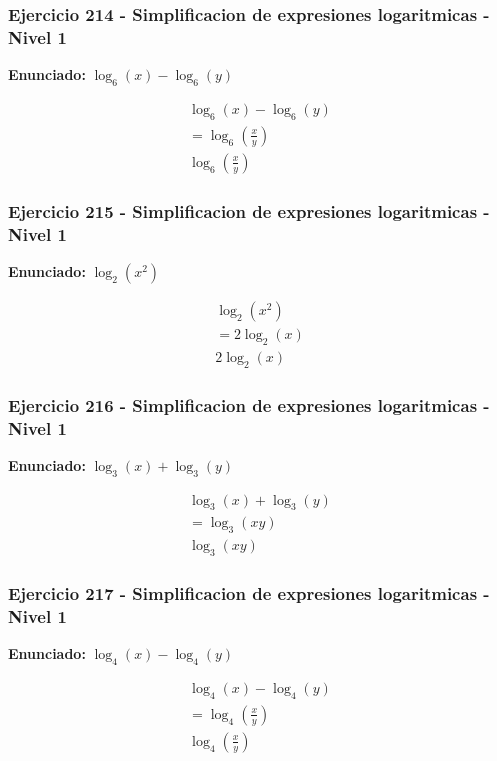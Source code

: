 \documentclass[12pt,a4paper]{article}
\begin{document}
\subsubsection*{Ejercicio 214 - Simplificacion de expresiones logaritmicas - Nivel 1}
\textbf{Enunciado:} \(\log_{6}\left(x\right)-\log_{6}\left(y\right)\)

\[
\begin{aligned}
\log_{6}\left(x\right)-\log_{6}\left(y\right)\\
=\log_{6}\left(\frac{x}{y}\right)\\
\boxed{\log_{6}\left(\frac{x}{y}\right)}
\end{aligned}
\]


\subsubsection*{Ejercicio 215 - Simplificacion de expresiones logaritmicas - Nivel 1}
\textbf{Enunciado:} \(\log_{2}\left(x^{2}\right)\)

\[
\begin{aligned}
\log_{2}\left(x^{2}\right)\\
=2\log_{2}\left(x\right)\\
\boxed{2\log_{2}\left(x\right)}
\end{aligned}
\]


\subsubsection*{Ejercicio 216 - Simplificacion de expresiones logaritmicas - Nivel 1}
\textbf{Enunciado:} \(\log_{3}\left(x\right)+\log_{3}\left(y\right)\)

\[
\begin{aligned}
\log_{3}\left(x\right)+\log_{3}\left(y\right)\\
=\log_{3}\left(xy\right)\\
\boxed{\log_{3}\left(xy\right)}
\end{aligned}
\]


\subsubsection*{Ejercicio 217 - Simplificacion de expresiones logaritmicas - Nivel 1}
\textbf{Enunciado:} \(\log_{4}\left(x\right)-\log_{4}\left(y\right)\)

\[
\begin{aligned}
\log_{4}\left(x\right)-\log_{4}\left(y\right)\\
=\log_{4}\left(\frac{x}{y}\right)\\
\boxed{\log_{4}\left(\frac{x}{y}\right)}
\end{aligned}
\]
\end{document}
